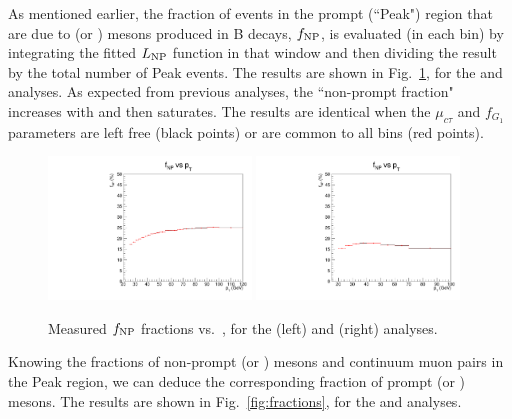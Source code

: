 \vfill\newpage

As mentioned earlier, the fraction of events in the prompt (``Peak") region 
that are due to \jpsi (or \psip) mesons produced in B decays, $f_{\rm NP}$, 
is evaluated (in each \pt bin) by integrating the fitted $L_{\rm NP}$ function
in that window and then dividing the result by the total number of Peak events.
The results are shown in Fig.~\ref{fig:fNP}, for the \jpsi and \psip analyses.
As expected from previous analyses,
the \jpsi ``non-prompt fraction" increases with \pt and then saturates.
The results are identical when the $\mu_{c\tau}$ and $f_{G_1}$ parameters
are left free (black points) or are common to all \pt bins (red points).

\begin{figure}[h]
\centering
\includegraphics[width=0.48\textwidth]{Figures/chapter4/fNP-jpsi.pdf}
\includegraphics[width=0.48\textwidth]{Figures/chapter4/fNP-psip.pdf}
\caption{Measured $f_{\rm NP}$ fractions vs.\ \pt, 
for the \jpsi (left) and \psip (right) analyses.}
\label{fig:fNP}
\end{figure}

Knowing the fractions of non-prompt \jpsi (or \psip) mesons 
and continuum muon pairs in the Peak region, 
we can deduce the corresponding fraction of prompt \jpsi (or \psip) mesons.
The results are shown in Fig.~\ref{fig:fractions}, for the \jpsi and \psip analyses.

